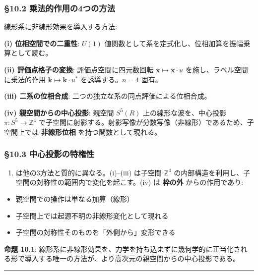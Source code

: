 \documentclass[
  a4paper,11pt]{ltjsarticle}
\providecommand{\tightlist}{%
  \setlength{\itemsep}{0pt}\setlength{\parskip}{0pt}}
\theoremstyle{definition}
\theoremstyle{remark}
\begin{document}
\subsubsection{§10.2
乗法的作用の4つの方法}\label{ux4e57ux6cd5ux7684ux4f5cux7528ux306e4ux3064ux306eux65b9ux6cd5}

線形系に非線形効果を導入する方法:

\textbf{(i) 位相空間での二重性}: \(U(1)\)
値関数として系を定式化し、位相加算を振幅乗算として読む。

\textbf{(ii) 評価点格子の変換}: 評価点空間に四元数回転
\(\mathbf{x} \mapsto \mathbf{x} \cdot u\) を施し、ラベル空間に乗法的作用
\(\mathbf{k} \mapsto \mathbf{k} \cdot u^*\) を誘導する。\(n = 4\) 固有。

\textbf{(iii) 二系の位相合成}: 二つの独立な系の同点評価による位相合成。

\textbf{(iv) 親空間からの中心投影}: 親空間 \(S^5(R)\)
上の線形な波を、中心投影 \(\pi : S^5 \to \mathbb{Z}^4\)
で子空間に射影する。射影写像が分数写像（非線形）であるため、子空間上では
\textbf{非線形位相} を持つ関数として現れる。

\subsubsection{§10.3
中心投影の特権性}\label{ux4e2dux5fc3ux6295ux5f71ux306eux7279ux6a29ux6027}

\begin{enumerate}
\def\labelenumi{(\roman{enumi})}
\setcounter{enumi}{3}
\tightlist
\item
  は他の3方法と質的に異なる。(i)--(iii) は子空間 \(\mathbb{Z}^4\)
  の内部構造を利用し、子空間の対称性の範囲内で変化を起こす。(iv) は
  \textbf{枠の外} からの作用であり:
\end{enumerate}

\begin{itemize}
\tightlist
\item
  親空間での操作は単なる加算（線形）
\item
  子空間上では起源不明の非線形変化として現れる
\item
  子空間の対称性そのものを「外側から」変形できる
\end{itemize}

\textbf{命題 10.1}:
線形系に非線形効果を、力学を持ち込まずに幾何学的に正当化される形で導入する唯一の方法が、より高次元の親空間からの中心投影である。

\begin{center}\rule{0.5\linewidth}{0.5pt}\end{center}
\end{document}
